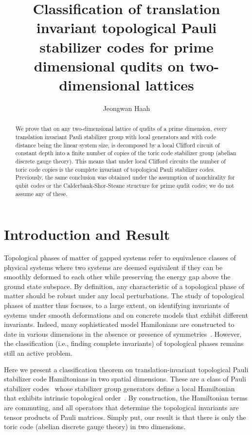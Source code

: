 \documentclass[aps,pra,
floatfix,notitlepage,
nofootinbib,
longbibliography,11pt]{revtex4-1}
\theoremstyle{definition}
\begin{document}
\title{Classification of translation invariant topological Pauli stabilizer codes 
for prime dimensional qudits on two-dimensional lattices}

\author{Jeongwan Haah}

\begin{abstract}
We prove that 
on any two-dimensional lattice of qudits of a prime dimension,
every translation invariant Pauli stabilizer group
with local generators and with code distance being the linear system size,
is decomposed by a local Clifford circuit of constant depth 
into a finite number of copies of the toric code stabilizer group (abelian discrete gauge theory).
This means that under local Clifford circuits
the number of toric code copies is the complete invariant of topological Pauli stabilizer codes.
Previously, the same conclusion was obtained
under the assumption of nonchirality for qubit codes
or the Calderbank-Shor-Steane structure for prime qudit codes;
we do not assume any of these.
\end{abstract}

\maketitle

\section{Introduction and Result}



Topological phases of matter of gapped systems refer to equivalence classes of physical systems
where two systems are deemed equivalent if they can be smoothly deformed to each other
while preserving the energy gap above the ground state subspace.
By definition, any characteristic of a topological phase of matter 
should be robust under any local perturbations.
The study of topological phases of matter thus focuses, to a large extent, 
on identifying invariants of systems under smooth deformations
and on concrete models that exhibit different invariants.
Indeed, many sophisticated model Hamilonians
are constructed to date in various dimensions in the absence or presence of symmetries~\cite{dijkgraaf1990topological,Levin_2005,WalkerWang}.
However, the classification (i.e., finding complete invariants) of topological phases 
remains still an active problem.

Here we present a classification theorem on
translation-invariant topological Pauli stabilizer code Hamiltonians in two spatial dimensions.
These are a class of Pauli stabilizer codes~\cite{CalderbankShor1996Good,Steane1996Multiple,Gottesman1996Saturating,CalderbankRainsShorEtAl1997Quantum}
whose stabilizer group generators define a local Hamiltonian
that exhibits intrinsic topological order~\cite{Wen1991SpinLiquid,Kitaev_2003}.
By construction, the Hamiltonian terms are commuting,
and all operators that determine the topological invariants
are tensor products of Pauli matrices.
Simply put, our result is that there is only the toric code (abelian discrete gauge theory)
in two dimensions.
\end{document}
